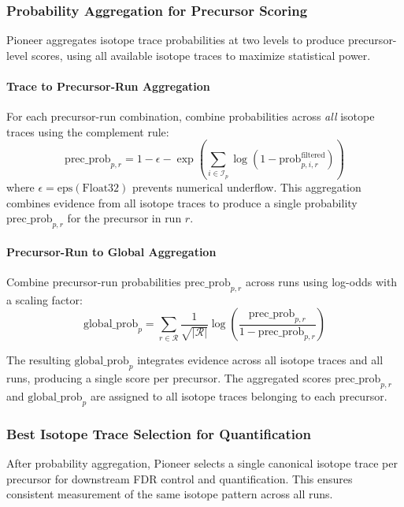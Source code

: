 \documentclass[pdflatex,sn-nature]{sn-jnl}
\begin{document}
\subsubsection{Probability Aggregation for Precursor Scoring}

Pioneer aggregates isotope trace probabilities at two levels to produce precursor-level scores, using all available isotope traces to maximize statistical power. 

\paragraph{Trace to Precursor-Run Aggregation} For each precursor-run combination, combine probabilities across \emph{all} isotope traces using the complement rule:
\begin{equation}
  \text{prec\_prob}_{p,r} = 1 - \epsilon - \exp\left(\sum_{i \in \mathcal{I}_p} \log(1 - \text{prob}_{p,i,r}^{\text{filtered}})\right)
\end{equation}
where $\epsilon = \text{eps}(\text{Float32})$ prevents numerical underflow. This aggregation combines evidence from all isotope traces to produce a single probability $\text{prec\_prob}_{p,r}$ for the precursor in run $r$.

\paragraph{Precursor-Run to Global Aggregation} Combine precursor-run probabilities $\text{prec\_prob}_{p,r}$ across runs using log-odds with a scaling factor:
\begin{equation}
  \text{global\_prob}_{p} = \sum_{r \in \mathcal{R}} \frac{1}{\sqrt{|\mathcal{R}|}} \log\left(\frac{\text{prec\_prob}_{p,r}}{1 - \text{prec\_prob}_{p,r}}\right)
\end{equation}

The resulting $\text{global\_prob}_p$ integrates evidence across all isotope traces and all runs, producing a single score per precursor. The aggregated scores $\text{prec\_prob}_{p,r}$ and $\text{global\_prob}_p$ are assigned to all isotope traces belonging to each precursor.

\subsubsection{Best Isotope Trace Selection for Quantification}

After probability aggregation, Pioneer selects a single canonical isotope trace per precursor for downstream FDR control and quantification. This ensures consistent measurement of the same isotope pattern across all runs.
\end{document}
